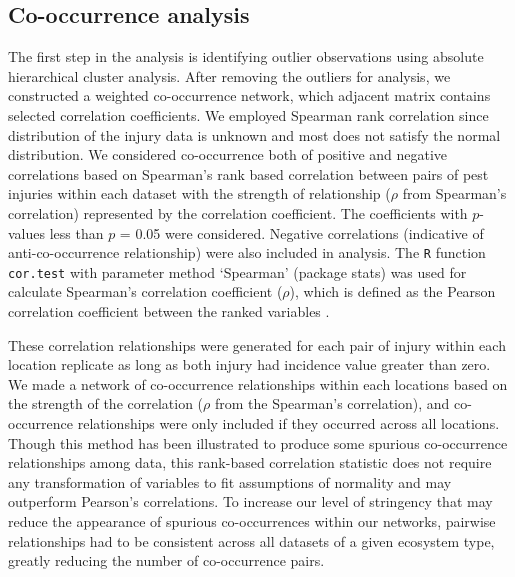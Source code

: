 \subsection*{Co-occurrence analysis}
The first step in the analysis is identifying outlier observations using absolute hierarchical cluster analysis. After removing the outliers for analysis, we constructed a weighted co-occurrence network, which adjacent matrix contains selected correlation coefficients. We employed Spearman rank correlation since distribution of the injury data is unknown and most does not satisfy the normal distribution. We considered co-occurrence both of positive and negative correlations based on Spearman's rank based correlation between pairs of pest injuries within each dataset with the strength of relationship ($\rho$ from Spearman's correlation) represented by the correlation coefficient. The coefficients with $p$-values less than $p$ = 0.05 were considered. Negative correlations (indicative of anti-co-occurrence relationship) were also included in analysis. The \texttt{R} function \texttt{cor.test} with parameter method `Spearman' (package stats) was used for calculate Spearman's correlation coefficient ($\rho$), which is defined as the Pearson correlation coefficient between the ranked variables \cite{R_2015}.

These correlation relationships were generated for each pair of injury within each location replicate as long as both injury had incidence value greater than zero. We made a network of co-occurrence relationships within each locations based on the strength of the correlation ($\rho$ from the Spearman's correlation), and co-occurrence relationships were only included if they occurred across all locations. Though this method has been illustrated to produce some spurious co-occurrence relationships among data, this rank-based correlation statistic does not require any transformation of variables to fit assumptions of normality and may outperform Pearson’s correlations. To increase our level of stringency that may reduce the appearance of spurious co-occurrences within our networks, pairwise relationships had to be consistent across all datasets of a given ecosystem type, greatly reducing the number of co-occurrence pairs.
